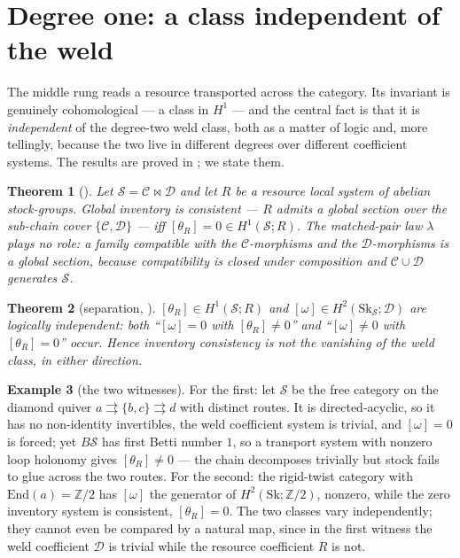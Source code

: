 \documentclass[11pt]{article}
\newtheorem{theorem}{Theorem}
\theoremstyle{definition}
\newtheorem{example}[theorem]{Example}
\newcommand{\Sk}{\mathrm{Sk}}
\newcommand{\Z}{\mathbb{Z}}
\newcommand{\sS}{\mathcal{S}}
\newcommand{\cC}{\mathcal{C}}
\newcommand{\cD}{\mathcal{D}}
\begin{document}
\section{Degree one: a class independent of the weld}\label{sec:deg1}

The middle rung reads a resource transported across the category. Its invariant is genuinely
cohomological --- a class in $H^1$ --- and the central fact is that it is \emph{independent} of the
degree-two weld class, both as a matter of logic and, more tellingly, because the two live in
different degrees over different coefficient systems. The results are proved in
\cite{MacBethSupplyChain}; we state them.

\begin{theorem}[\cite{MacBethSupplyChain}]\label{thm:deg1}
Let $\sS=\cC\bowtie\cD$ and let $R$ be a resource local system of abelian stock-groups. Global
inventory is consistent --- $R$ admits a global section over the sub-chain cover $\{\cC,\cD\}$ ---
iff $[\theta_R]=0\in H^1(\sS;R)$. The matched-pair law $\lambda$ plays no role: a family compatible
with the $\cC$-morphisms and the $\cD$-morphisms is a global section, because compatibility is
closed under composition and $\cC\cup\cD$ generates $\sS$.
\end{theorem}

\begin{theorem}[separation, \cite{MacBethSupplyChain}]\label{thm:sep}
$[\theta_R]\in H^1(\sS;R)$ and $[\omega]\in H^2(\Sk_\sS;\cD)$ are logically independent: both
``$[\omega]=0$ with $[\theta_R]\neq 0$'' and ``$[\omega]\neq0$ with $[\theta_R]=0$'' occur. Hence
inventory consistency is \emph{not} the vanishing of the weld class, in either direction.
\end{theorem}

\begin{example}[the two witnesses]\label{ex:deg1}
For the first: let $\sS$ be the free category on the diamond quiver $a\rightrightarrows\{b,c\}
\rightrightarrows d$ with distinct routes. It is directed-acyclic, so it has no non-identity
invertibles, the weld coefficient system is trivial, and $[\omega]=0$ is forced; yet $B\sS$ has
first Betti number $1$, so a transport system with nonzero loop holonomy gives $[\theta_R]\neq0$
--- the chain decomposes trivially but stock fails to glue across the two routes. For the second:
the rigid-twist category with $\mathrm{End}(a)=\Z/2$ has $[\omega]$ the generator of
$H^2(\Sk;\Z/2)$, nonzero, while the zero inventory system is consistent, $[\theta_R]=0$. The two
classes vary independently; they cannot even be compared by a natural map, since in the first
witness the weld coefficient $\cD$ is trivial while the resource coefficient $R$ is not.
\end{example}
\end{document}
